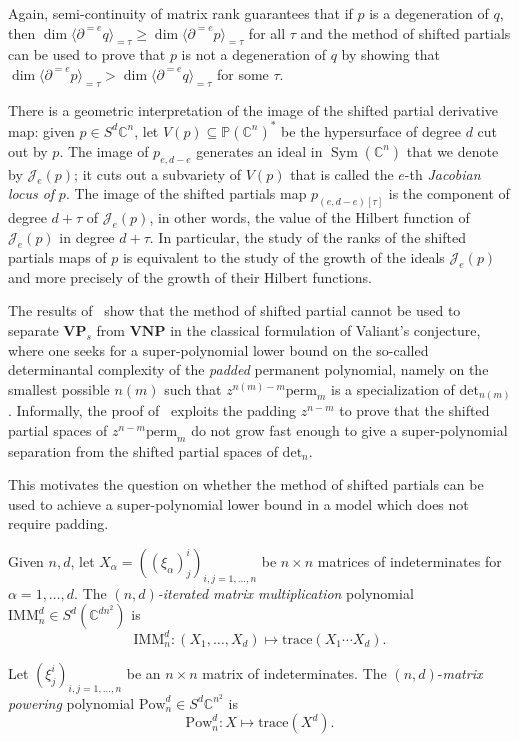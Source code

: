 \documentclass{toc}
\newcommand{\vvirg}{ , \dots , }
\newcommand{\calJ}{\mathcal{J}}
\newcommand{\bbC}{\mathbb{C}}
\newcommand{\bbP}{\mathbb{P}}
\DeclareMathOperator{\Sym}{Sym}
\newcommand{\bfVNP}{\mathbf{VNP}}
\newcommand{\bfVP}{\mathbf{VP}}
\newcommand{\perm}{\mathrm{perm}}
\newcommand{\Pow}{\mathrm{Pow}}
\newcommand{\trace}{\mathrm{trace}}
\renewcommand{\det}{\mathrm{det}}
\def\BC{\mathbb C}
\def\t{\tau}
\newcommand{\IMM}{\mathrm{IMM}}
\begin{document}
Again, semi-continuity of matrix rank guarantees that if $p$ is a degeneration of $q$, then $\dim \langle \partial^{=e} q \rangle_{=\t} \geq  \dim \langle \partial^{=e}p \rangle_{=\tau}$ for all $\t$ and the method of shifted partials can be used to prove that $p$ is not a degeneration of $q$ by showing that $\dim \langle \partial^{=e}p \rangle_{=\t} > \dim \langle \partial^{=e} q \rangle_{=\t}$ for some $\t$.

 There is a geometric interpretation of the image of the shifted partial derivative map: given $p \in S^d \bbC^n$, let $V(p) \subseteq \bbP (\bbC^n)^*$ be the hypersurface of degree $d$ cut out by $p$. The image of $p_{e,d-e}$ generates an ideal in $\Sym(\bbC^n)$ that we denote by $\calJ_e(p)$; it cuts out a subvariety of $V(p)$ that is called the $e$-th \emph{Jacobian locus of} $p$. The image of the shifted partials map $p_{(e,d-e)[\tau]}$ is the component of degree $d+\tau$ of $\calJ_e(p)$, in other words, the value of the Hilbert function of $\calJ_e(p)$ in degree $d+\t$.  In particular, the study of the ranks of the shifted partials maps of $p$ is equivalent to the study of the growth of the ideals $\calJ_e(p)$ and more precisely of the growth of their Hilbert functions.  

 The results of~\cite{2016arXiv160902103E} show that the method of shifted partial cannot be used to separate $\bfVP_s$ from $\bfVNP$ in the classical formulation of Valiant's conjecture, where one seeks for a super-polynomial lower bound on the so-called determinantal complexity of the \emph{padded} permanent polynomial, namely on the smallest possible $n(m)$ such that $z^{n(m)- m} \perm_m$ is a specialization of $\det_{n(m)}$. Informally, the proof of~\cite{2016arXiv160902103E} exploits the padding $z^{n-m}$ to prove that the shifted partial spaces of $z^{n-m} \perm_m$ do not grow fast enough to give a super-polynomial separation from the shifted partial spaces of $\det_n$.
 
This motivates the question on whether the method of shifted partials can be used to achieve a super-polynomial lower bound in a model which does not require padding.

\begin{definition}
Given $n,d$, let $X_\alpha = ((\xi_\alpha)^i_j)_{i,j = 1 \vvirg n}$ be $n \times n$ matrices of indeterminates for $\alpha = 1 \vvirg d$. The \emph{$(n,d)$-iterated matrix multiplication} polynomial $\IMM^d_n\in S^d(\BC^{dn^2})$ is 
\[
\IMM^d_n: (X_1\vvirg X_d)\mapsto \trace(X_1\cdots X_d).
\] 

Let $(\xi^i_j)_{i,j = 1 \vvirg n}$ be an $n\times n$ matrix of indeterminates. The $(n,d)$-\emph{matrix powering} polynomial $\Pow^d_n\in S^d\BC^{n^2}$ is
\[
 \Pow^d_n : X \mapsto \trace(X^d).
\]
\end{definition}
\end{document}
